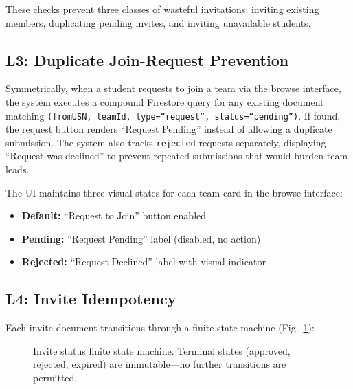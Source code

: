 \documentclass[conference]{IEEEtran}
\begin{document}
These checks prevent three classes of wasteful invitations: inviting existing members, duplicating pending invites, and inviting unavailable students.

\subsection{L3: Duplicate Join-Request Prevention}

Symmetrically, when a student requests to join a team via the browse interface, the system executes a compound Firestore query for any existing document matching \texttt{(fromUSN, teamId, type=``request'', status=``pending'')}. If found, the request button renders ``Request Pending'' instead of allowing a duplicate submission. The system also tracks \texttt{rejected} requests separately, displaying ``Request was declined'' to prevent repeated submissions that would burden team leads.

The UI maintains three visual states for each team card in the browse interface:
\begin{itemize}[noitemsep,topsep=3pt]
    \item \textbf{Default:} ``Request to Join'' button enabled
    \item \textbf{Pending:} ``Request Pending'' label (disabled, no action)
    \item \textbf{Rejected:} ``Request Declined'' label with visual indicator
\end{itemize}

\subsection{L4: Invite Idempotency}

Each invite document transitions through a finite state machine (Fig.~\ref{fig:invitefsm}):

\begin{figure}[htbp]
\centering
{}
\caption{Invite status finite state machine. Terminal states (approved, rejected, expired) are immutable---no further transitions are permitted.}
\label{fig:invitefsm}
\end{figure}
\end{document}
